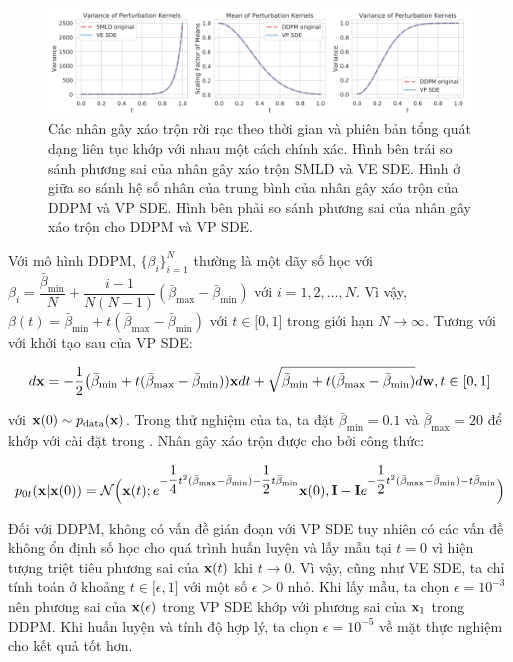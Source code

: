 \documentclass{article} %
\begin{document}
\begin{figure}[h!]
    \centering
    \includegraphics[width=0.9\linewidth]{figures/5.png}
    \caption{Các nhân gây xáo trộn rời rạc theo thời gian và phiên bản tổng quát dạng liên tục khớp với nhau một cách chính xác.
    Hình bên trái so sánh phương sai của nhân gây xáo trộn SMLD và VE SDE.
    Hình ở giữa so sánh hệ số nhân của trung bình của nhân gây xáo trộn của DDPM và VP SDE.
    Hình bên phải so sánh phương sai của nhân gây xáo trộn cho DDPM và VP SDE.}
    \label{fig:5}
\end{figure}

Với mô hình DDPM, $\lbrace \beta_i \rbrace_{i=1}^N$ thường là một dãy số học với $\beta_i = \dfrac{\bar{\beta}_{\min}}{N} + \dfrac{i-1}{N(N-1)}(\bar{\beta}_{\max}-\bar{\beta}_{\min})$ với $i=1, 2, \dots, N$.
Vì vậy, $\beta(t) = \bar{\beta}_{\min} + t (\bar{\beta}_{\max} - \bar{\beta}_{\min})$ với $t \in \lbrack 0, 1 \rbrack$ trong giới hạn $N \rightarrow \infty$.
Tương với với khởi tạo sau của VP SDE:

\begin{equation} \label{eq:32}
    d \bold{x} = -\dfrac{1}{2} \big( \bar{\beta}_{\min} + t (\bar{\beta}_{\max} - \bar{\beta}_{\min})) \bold{x} dt + \sqrt{\bar{\beta}_{\min} + t (\bar{\beta}_{\max} - \bar{\beta}_{\min})} d \bold{w}, t \in \lbrack 0, 1 \rbrack
\end{equation}

với $\bold{x}(0) \sim p_{\mathrm{data}}(\bold{x})$.
Trong thử nghiệm của ta, ta đặt $\bar{\beta}_{\min}=0.1$ và $\bar{\beta}_{\max}=20$ để khớp với cài đặt trong \citep{ho2020denoising}.
Nhân gây xáo trộn được cho bởi công thức:

\begin{equation} \label{eq:32}
    p_{0t} (\bold{x} \vert \bold{x}(0)) = \mathcal{N} \Big( \bold{x}(t); e^{-\dfrac{1}{4}t^2 (\bar{\beta}_{\max} - \bar{\beta}_{\min})-\dfrac{1}{2}t \bar{\beta}_{\min}} \bold{x}(0), \bold{I} - \bold{I} e^{-\dfrac{1}{2}t^2 (\bar{\beta}_{\max} - \bar{\beta}_{\min}) - t \bar{\beta}_{\min}} \Big)
\end{equation}

Đối với DDPM, không có vấn đề gián đoạn với VP SDE tuy nhiên có các vấn đề không ổn định số học cho quá trình huấn luyện và lấy mẫu tại $t=0$ vì hiện tượng triệt tiêu phương sai của $\bold{x}(t)$ khi $t \rightarrow 0$.
Vì vậy, cũng như VE SDE, ta chỉ tính toán ở khoảng $t \in \lbrack \epsilon, 1 \rbrack$ với một số $\epsilon > 0$ nhỏ.
Khi lấy mẫu, ta chọn $\epsilon = 10^{-3}$ nên phương sai của $\bold{x}(\epsilon)$ trong VP SDE khớp với phương sai của $\bold{x}_1$ trong DDPM.
Khi huấn luyện và tính độ hợp lý, ta chọn $\epsilon = 10^{-5}$ về mặt thực nghiệm cho kết quả tốt hơn.
\end{document}
